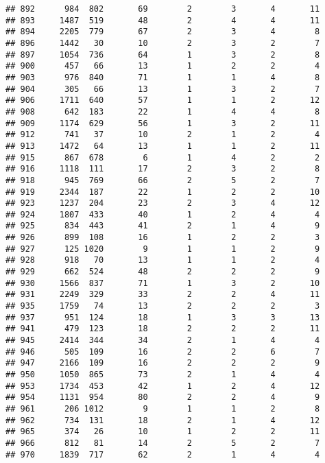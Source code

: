 \documentclass[]{article}
\begin{document}
\begin{verbatim}
## 892      984  802       69        2        3       4       11
## 893     1487  519       48        2        4       4       11
## 894     2205  779       67        2        3       4        8
## 896     1442   30       10        2        3       2        7
## 897     1054  736       64        1        3       2        8
## 900      457   66       13        1        2       2        4
## 903      976  840       71        1        1       4        8
## 904      305   66       13        1        3       2        7
## 906     1711  640       57        1        1       2       12
## 908      642  183       22        1        4       4        8
## 909     1174  629       56        1        3       2       11
## 912      741   37       10        2        1       2        4
## 913     1472   64       13        1        1       2       11
## 915      867  678        6        1        4       2        2
## 916     1118  111       17        2        3       2        8
## 918      945  769       66        2        5       2        7
## 919     2344  187       22        1        2       2       10
## 923     1237  204       23        2        3       4       12
## 924     1807  433       40        1        2       4        4
## 925      834  443       41        2        1       4        9
## 926      899  108       16        1        2       2        3
## 927      125 1020        9        1        1       2        9
## 928      918   70       13        1        1       2        4
## 929      662  524       48        2        2       2        9
## 930     1566  837       71        1        3       2       10
## 931     2249  329       33        2        2       4       11
## 935     1759   74       13        2        2       2        3
## 937      951  124       18        1        3       3       13
## 941      479  123       18        2        2       2       11
## 945     2414  344       34        2        1       4        4
## 946      505  109       16        2        2       6        7
## 947     2166  109       16        2        2       2        9
## 950     1050  865       73        2        1       4        4
## 953     1734  453       42        1        2       4       12
## 954     1131  954       80        2        2       4        9
## 961      206 1012        9        1        1       2        8
## 962      734  131       18        2        1       4       12
## 965      374   26       10        1        2       2       11
## 966      812   81       14        2        5       2        7
## 970     1839  717       62        2        1       4        4

\end{verbatim}
\end{document}
